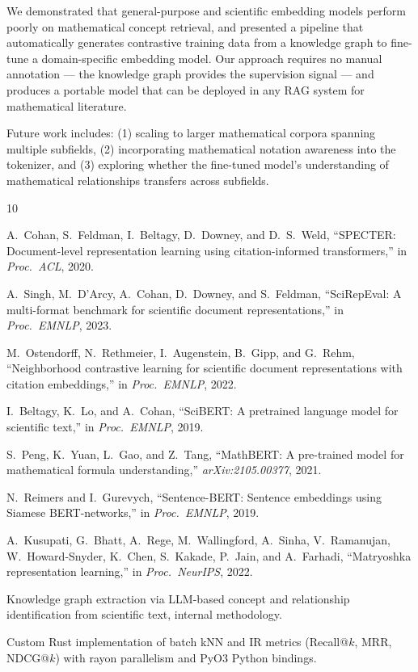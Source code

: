 \documentclass[11pt,a4paper]{article}
\begin{document}
We demonstrated that general-purpose and scientific embedding models perform
poorly on mathematical concept retrieval, and presented a pipeline that
automatically generates contrastive training data from a knowledge graph to
fine-tune a domain-specific embedding model. Our approach requires no manual
annotation --- the knowledge graph provides the supervision signal --- and
produces a portable model that can be deployed in any RAG system for
mathematical literature.

Future work includes: (1) scaling to larger mathematical corpora spanning
multiple subfields, (2) incorporating mathematical notation awareness into
the tokenizer, and (3) exploring whether the fine-tuned model's understanding
of mathematical relationships transfers across subfields.


\begin{thebibliography}{10}

A.~Cohan, S.~Feldman, I.~Beltagy, D.~Downey, and D.~S.~Weld,
``SPECTER: Document-level representation learning using citation-informed
transformers,'' in \emph{Proc.\ ACL}, 2020.

A.~Singh, M.~D'Arcy, A.~Cohan, D.~Downey, and S.~Feldman,
``SciRepEval: A multi-format benchmark for scientific document
representations,'' in \emph{Proc.\ EMNLP}, 2023.

M.~Ostendorff, N.~Rethmeier, I.~Augenstein, B.~Gipp, and G.~Rehm,
``Neighborhood contrastive learning for scientific document
representations with citation embeddings,'' in \emph{Proc.\ EMNLP}, 2022.

I.~Beltagy, K.~Lo, and A.~Cohan,
``SciBERT: A pretrained language model for scientific text,'' in
\emph{Proc.\ EMNLP}, 2019.

S.~Peng, K.~Yuan, L.~Gao, and Z.~Tang,
``MathBERT: A pre-trained model for mathematical formula understanding,''
\emph{arXiv:2105.00377}, 2021.

N.~Reimers and I.~Gurevych,
``Sentence-BERT: Sentence embeddings using Siamese BERT-networks,'' in
\emph{Proc.\ EMNLP}, 2019.

A.~Kusupati, G.~Bhatt, A.~Rege, M.~Wallingford, A.~Sinha, V.~Ramanujan,
W.~Howard-Snyder, K.~Chen, S.~Kakade, P.~Jain, and A.~Farhadi,
``Matryoshka representation learning,'' in \emph{Proc.\ NeurIPS}, 2022.

Knowledge graph extraction via LLM-based concept and relationship
identification from scientific text, internal methodology.

Custom Rust implementation of batch kNN and IR metrics (Recall@$k$, MRR,
NDCG@$k$) with rayon parallelism and PyO3 Python bindings.

\end{thebibliography}
\end{document}
